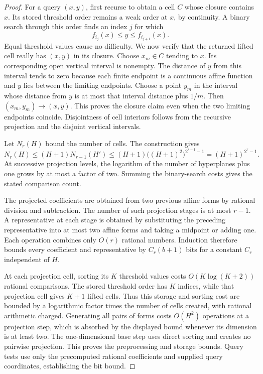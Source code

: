 \begin{proof}
For a query $(x,y)$, first recurse to obtain a cell $C$ whose
closure contains $x$.  Its stored threshold order remains a weak
order at $x$, by continuity.  A binary search through this order
finds an index $j$ for which
\[
 f_{i_j}(x)\le y\le f_{i_{j+1}}(x).
\]
Equal threshold values cause no difficulty.  We now verify that
the returned lifted cell really has $(x,y)$ in its closure.
Choose $x_m\in C$ tending to $x$.  Its corresponding open vertical
interval is nonempty.  The distance of $y$ from this interval
tends to zero because each finite endpoint is a continuous affine
function and $y$ lies between the limiting endpoints.  Choose a
point $y_m$ in the interval whose distance from $y$ is at most
that interval distance plus $1/m$.  Then
$(x_m,y_m)\to(x,y)$.  This proves the closure claim even when the
two limiting endpoints coincide.  Disjointness of cell interiors
follows from the recursive projection and the disjoint vertical
intervals.

Let $N_r(H)$ bound the number of cells.  The construction gives
\[
 N_r(H)\le(H+1)N_{r-1}(H')
 \le(H+1)\bigl((H+1)^2\bigr)^{2^{r-1}-1}
 =(H+1)^{2^r-1}.
\]
At successive projection levels, the logarithm of the number of
hyperplanes plus one grows by at most a factor of two.  Summing
the binary-search costs gives the stated comparison count.

The projected coefficients are obtained from two previous affine
forms by rational division and subtraction.  The number of such
projection stages is at most $r-1$.  A representative at each
stage is obtained by substituting the preceding representative
into at most two affine forms and taking a midpoint or adding one.
Each operation combines only $O(r)$ rational numbers.  Induction
therefore bounds every coefficient and representative by
$C_r(b+1)$ bits for a constant $C_r$ independent of $H$.

At each projection cell, sorting its $K$ threshold values costs
$O(K\log(K+2))$ rational comparisons.  The stored threshold order
has $K$ indices, while that projection cell gives $K+1$ lifted
cells.  Thus this storage and sorting cost are bounded by a
logarithmic factor times the number of cells created, with rational
arithmetic charged.  Generating all pairs of forms costs $O(H^2)$
operations at a projection step, which is absorbed by the displayed
bound whenever its dimension is at least two.  The one-dimensional
base step uses direct sorting and creates no pairwise projection.
This proves the preprocessing and storage bounds.  Query tests
use only the precomputed rational coefficients and supplied query
coordinates, establishing the bit bound.
\end{proof}


